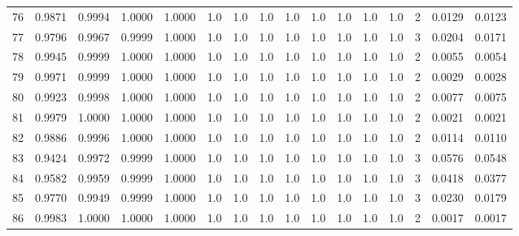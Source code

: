 \begin{tabular}{lrrrrrrrrrrrrrrr}
76  &      0.9871 &  0.9994 &  1.0000 &  1.0000 &     1.0 &     1.0 &     1.0 &     1.0 &     1.0 &     1.0 &      1.0 &        1.0 &      2 &                    0.0129 &                     0.0123 \\
77  &      0.9796 &  0.9967 &  0.9999 &  1.0000 &     1.0 &     1.0 &     1.0 &     1.0 &     1.0 &     1.0 &      1.0 &        1.0 &      3 &                    0.0204 &                     0.0171 \\
78  &      0.9945 &  0.9999 &  1.0000 &  1.0000 &     1.0 &     1.0 &     1.0 &     1.0 &     1.0 &     1.0 &      1.0 &        1.0 &      2 &                    0.0055 &                     0.0054 \\
79  &      0.9971 &  0.9999 &  1.0000 &  1.0000 &     1.0 &     1.0 &     1.0 &     1.0 &     1.0 &     1.0 &      1.0 &        1.0 &      2 &                    0.0029 &                     0.0028 \\
80  &      0.9923 &  0.9998 &  1.0000 &  1.0000 &     1.0 &     1.0 &     1.0 &     1.0 &     1.0 &     1.0 &      1.0 &        1.0 &      2 &                    0.0077 &                     0.0075 \\
81  &      0.9979 &  1.0000 &  1.0000 &  1.0000 &     1.0 &     1.0 &     1.0 &     1.0 &     1.0 &     1.0 &      1.0 &        1.0 &      2 &                    0.0021 &                     0.0021 \\
82  &      0.9886 &  0.9996 &  1.0000 &  1.0000 &     1.0 &     1.0 &     1.0 &     1.0 &     1.0 &     1.0 &      1.0 &        1.0 &      2 &                    0.0114 &                     0.0110 \\
83  &      0.9424 &  0.9972 &  0.9999 &  1.0000 &     1.0 &     1.0 &     1.0 &     1.0 &     1.0 &     1.0 &      1.0 &        1.0 &      3 &                    0.0576 &                     0.0548 \\
84  &      0.9582 &  0.9959 &  0.9999 &  1.0000 &     1.0 &     1.0 &     1.0 &     1.0 &     1.0 &     1.0 &      1.0 &        1.0 &      3 &                    0.0418 &                     0.0377 \\
85  &      0.9770 &  0.9949 &  0.9999 &  1.0000 &     1.0 &     1.0 &     1.0 &     1.0 &     1.0 &     1.0 &      1.0 &        1.0 &      3 &                    0.0230 &                     0.0179 \\
86  &      0.9983 &  1.0000 &  1.0000 &  1.0000 &     1.0 &     1.0 &     1.0 &     1.0 &     1.0 &     1.0 &      1.0 &        1.0 &      2 &                    0.0017 &                     0.0017 \\

\end{tabular}
